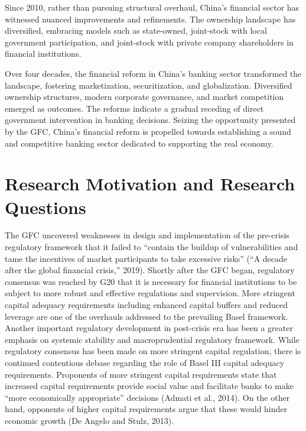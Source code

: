 \documentclass[
  letterpaper,
  DIV=11,
  numbers=noendperiod]{scrreprt}
\begin{document}
Since 2010, rather than pursuing structural overhaul, China's financial
sector has witnessed nuanced improvements and refinements. The ownership
landscape has diversified, embracing models such as state-owned,
joint-stock with local government participation, and joint-stock with
private company shareholders in financial institutions.

Over four decades, the financial reform in China's banking sector
transformed the landscape, fostering marketization, securitization, and
globalization. Diversified ownership structures, modern corporate
governance, and market competition emerged as outcomes. The reforms
indicate a gradual receding of direct government intervention in banking
decisions. Seizing the opportunity presented by the GFC, China's
financial reform is propelled towards establishing a sound and
competitive banking sector dedicated to supporting the real economy.

\section{Research Motivation and Research
Questions}\label{research-motivation-and-research-questions}

The GFC uncovered weaknesses in design and implementation of the
pre-crisis regulatory framework that it failed to ``contain the buildup
of vulnerabilities and tame the incentives of market participants to
take excessive risks'' ({``A decade after the global financial
crisis,''} 2019). Shortly after the GFC began, regulatory consensus was
reached by G20 that it is necessary for financial institutions to be
subject to more robust and effective regulations and supervision. More
stringent capital adequacy requirements including enhanced capital
buffers and reduced leverage are one of the overhauls addressed to the
prevailing Basel framework. Another important regulatory development in
post-crisis era has been a greater emphasis on systemic stability and
macroprudential regulatory framework. While regulatory consensus has
been made on more stringent capital regulation, there is continued
contentious debase regarding the role of Basel III capital adequacy
requirements. Proponents of more stringent capital requirements state
that increased capital requirements provide social value and facilitate
banks to make ``more economically appropriate'' decisions (Admati et
al., 2014). On the other hand, opponents of higher capital requirements
argue that these would hinder economic growth (De Angelo and Stulz,
2013).
\end{document}
